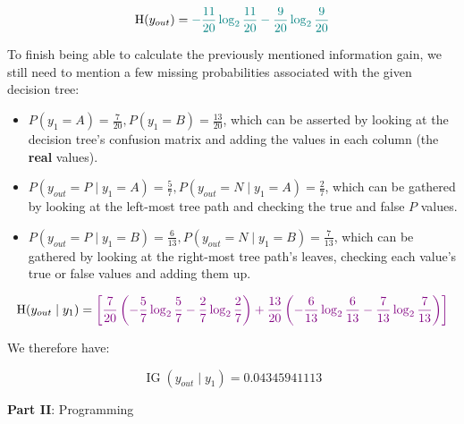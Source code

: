 \documentclass[12pt]{article}
\begin{document}
\begin{enumerate}[leftmargin=\labelsep]
        \begin{equation}
          \operatorname{H}(y_{out}) = \textcolor{teal}{- \frac{11}{20} \log_2 \frac{11}{20} - \frac{9}{20} \log_2 \frac{9}{20}}
        \end{equation}

        To finish being able to calculate the previously mentioned information gain, we still
        need to mention a few missing probabilities associated with the given decision tree:

        \begin{itemize}
          \item $P(y_1 = A) = \frac{7}{20}, P(y_1 = B) = \frac{13}{20}$,
                which can be asserted by looking at the decision tree's confusion matrix
                and adding the values in each column (the \textbf{real} values).
          \item $P(y_{out} = P \mid y_1 = A) = \frac{5}{7}, P(y_{out} = N \mid y_1 = A) = \frac{2}{7}$,
                which can be gathered by looking at the left-most tree path and checking the true
                and false $P$ values.
          \item $P(y_{out} = P \mid y_1 = B) = \frac{6}{13}, P(y_{out} = N \mid y_1 = B) = \frac{7}{13}$,
                which can be gathered by looking at the right-most tree path's leaves,
                checking each value's true or false values and adding them up.
        \end{itemize}

        \begin{equation}
          \operatorname{H}(y_{out} \mid y_1) = \textcolor{violet}{\left[\frac{7}{20}\left(- {\frac{5}{7}} \log_2 \frac{5}{7} - \frac{2}{7} \log_2 \frac{2}{7}\right) + \frac{13}{20}\left(- \frac{6}{13} \log_2 \frac{6}{13} - \frac{7}{13} \log_2 \frac{7}{13}\right)\right]}
        \end{equation}

        We therefore have:

        $$
          \operatorname{IG}(y_{out} \mid y_1) = 0.04345941113
        $$

\end{enumerate}

\center\large{\textbf{Part II}: Programming}
\end{document}
